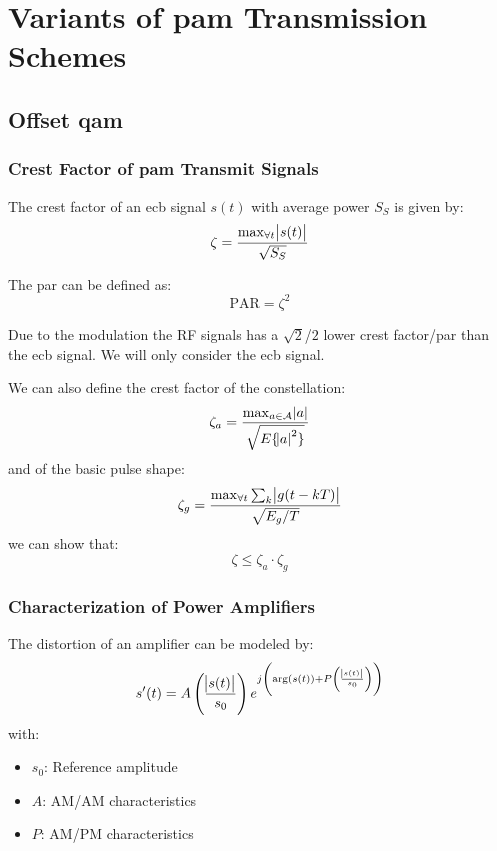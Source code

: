 \chapter{Variants of \acl{pam} Transmission Schemes}
\section{Offset \acl{qam}}
\subsection{Crest Factor of \acl{pam} Transmit Signals}
The crest factor of an \ac{ecb} signal $s(t)$ with average power $S_S$ is given by:
\begin{equation}
    \zeta = \frac{\max_{\forall t} \abs{s(t)}}{\sqrt{S_S}}
\end{equation}

The \ac{par} can be defined as:
\begin{equation}
    \text{PAR} = \zeta^2
\end{equation}

Due to the modulation the RF signals has a $\sqrt{2}$/$2$ lower crest factor/\ac{par}
than the \ac{ecb} signal. We will only consider the \ac{ecb} signal.

We can also define the crest factor of the constellation:
\begin{equation}
    \zeta_a = \frac{\max_{a \in \mathcal{A}} \abs{a}}{\sqrt{E\{\abs{a}^2\}}}
\end{equation}
and of the basic pulse shape:
\begin{equation}
    \zeta_g = \frac{\max_{\forall t} \sum_k \abs{g(t-kT)}}{\sqrt{E_g /T}}
\end{equation}
we can show that:
\begin{equation}
    \zeta \leq \zeta_a \cdot \zeta_g
\end{equation}

\subsection{Characterization of Power Amplifiers}
The distortion of an amplifier can be modeled by:
\begin{equation}
    s'(t) = A\left(\frac{\abs{s(t)}}{s_0}\right) 
        e^{j \left(\arg(s(t)) + P\left(\frac{\abs{s(t)}}{s_0}\right)\right)}
\end{equation}
with:
\begin{itemize}
    \item $s_0$: Reference amplitude
    \item $A$: AM/AM characteristics
    \item $P$: AM/PM characteristics
\end{itemize}

